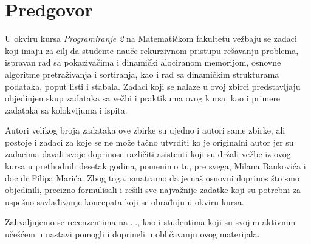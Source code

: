 
\chapter*{Predgovor}

U okviru kursa {\em Programiranje 2} na Matematičkom fakultetu vežbaju se zadaci koji imaju za cilj da studente nauče rekurzivnom pristupu rešavanju problema, ispravan rad sa pokazivačima i dinamički alociranom memorijom,  osnovne algoritme pretraživanja i sortiranja, kao i rad sa dinamičkim strukturama podataka, poput listi i stabala.  Zadaci koji se nalaze u ovoj zbirci predstavljaju objedinjen skup zadataka sa vežbi i praktikuma ovog kursa, kao i primere zadataka sa kolokvijuma i ispita. 

Autori velikog broja zadataka ove zbirke su ujedno i autori same zbirke, ali postoje i zadaci za koje se ne može tačno utvrditi ko je originalni autor jer su zadacima davali svoje doprinose različiti asistenti koji su držali vežbe iz ovog kursa u prethodnih desetak godina, pomenimo tu, pre svega, Milana Bankovića i doc dr Filipa Marića. Zbog toga, smatramo da je naš osnovni doprinos što smo objedinili, precizno formulisali i rešili sve najvažnije zadatke koji su potrebni za uspešno savlađivanje koncepata koji se obrađuju u okviru kursa. 

Zahvaljujemo se recenzentima na ..., kao i studentima koji su svojim aktivnim učešćem u nastavi pomogli i doprineli u obličavanju ovog materijala. 




\bigskip
{}
